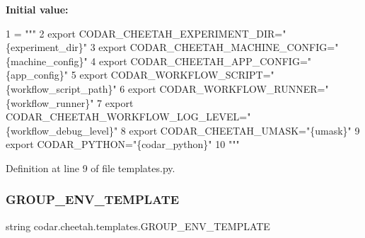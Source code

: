 {\bfseries Initial value\+:}
\begin{DoxyCode}
1 =  \textcolor{stringliteral}{"""}
2 \textcolor{stringliteral}{export CODAR\_CHEETAH\_EXPERIMENT\_DIR="\{experiment\_dir\}"}
3 \textcolor{stringliteral}{export CODAR\_CHEETAH\_MACHINE\_CONFIG="\{machine\_config\}"}
4 \textcolor{stringliteral}{export CODAR\_CHEETAH\_APP\_CONFIG="\{app\_config\}"}
5 \textcolor{stringliteral}{export CODAR\_WORKFLOW\_SCRIPT="\{workflow\_script\_path\}"}
6 \textcolor{stringliteral}{export CODAR\_WORKFLOW\_RUNNER="\{workflow\_runner\}"}
7 \textcolor{stringliteral}{export CODAR\_CHEETAH\_WORKFLOW\_LOG\_LEVEL="\{workflow\_debug\_level\}"}
8 \textcolor{stringliteral}{export CODAR\_CHEETAH\_UMASK="\{umask\}"}
9 \textcolor{stringliteral}{export CODAR\_PYTHON="\{codar\_python\}"}
10 \textcolor{stringliteral}{"""}
\end{DoxyCode}


Definition at line 9 of file templates.\+py.

\mbox{\label{namespacecodar_1_1cheetah_1_1templates_a5f3128e651f6b9b80eb8c492b2f3edd1}} 
\subsubsection{\texorpdfstring{G\+R\+O\+U\+P\+\_\+\+E\+N\+V\+\_\+\+T\+E\+M\+P\+L\+A\+TE}{GROUP\_ENV\_TEMPLATE}}
{\footnotesize\ttfamily string codar.\+cheetah.\+templates.\+G\+R\+O\+U\+P\+\_\+\+E\+N\+V\+\_\+\+T\+E\+M\+P\+L\+A\+TE}

